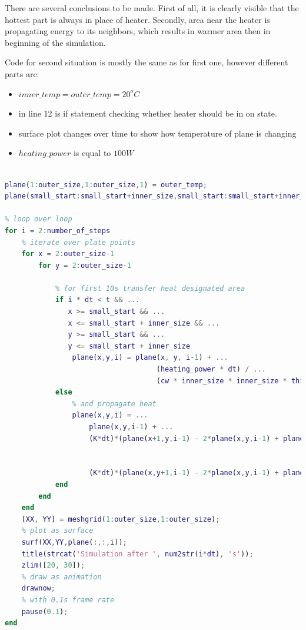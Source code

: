 \documentclass[onecolumn]{article}
\begin{document}
There are several conclusions to be made. First of all, it is clearly visible that the hottest part is always in place of heater. Secondly, area near the heater is propagating energy to its neighbors, which results in warmer area then in beginning of the simulation.

Code for second situation is mostly the same as for first one, however different parts are:
\begin{itemize}
    \item $inner\_temp = outer\_temp = 20^{o}C$
    \item in line 12 is if statement checking whether heater should be in on state.
    \item surface plot changes over time to show how temperature of plane is changing
    \item $heating\_power$ is equal to $100W$
\end{itemize}
\begin{lstlisting}[language=Matlab,frame=single,label={lst:bc2},breaklines=true,caption={matlab script implementing second boundary condition}]

plane(1:outer_size,1:outer_size,1) = outer_temp;
plane(small_start:small_start+inner_size,small_start:small_start+inner_size, 1) = inner_temp;

% loop over loop
for i = 2:number_of_steps
    % iterate over plate points
    for x = 2:outer_size-1
        for y = 2:outer_size-1
            
            % for first 10s transfer heat designated area
            if i * dt < t && ...
               x >= small_start && ...
               x <= small_start + inner_size && ...
               y >= small_start && ...
               y <= small_start + inner_size
                plane(x,y,i) = plane(x, y, i-1) + ...
                                    (heating_power * dt) / ...
                                    (cw * inner_size * inner_size * thickness * ro);
            else
                % and propagate heat
                plane(x,y,i) = ...
                    plane(x,y,i-1) + ...
                    (K*dt)*(plane(x+1,y,i-1) - 2*plane(x,y,i-1) + plane(x-1,y,i-1))/(cw*ro*dx*dx) + ...
                    
                    
                    (K*dt)*(plane(x,y+1,i-1) - 2*plane(x,y,i-1) + plane(x,y-1,i-1))/(cw*ro*dy*dy);
            end
        end
    end
    [XX, YY] = meshgrid(1:outer_size,1:outer_size);
    % plot as surface
    surf(XX,YY,plane(:,:,i));
    title(strcat('Simulation after ', num2str(i*dt), 's'));
    zlim([20, 30]);
    % draw as animation
    drawnow;
    % with 0.1s frame rate
    pause(0.1);
end
\end{lstlisting}
\end{document}
